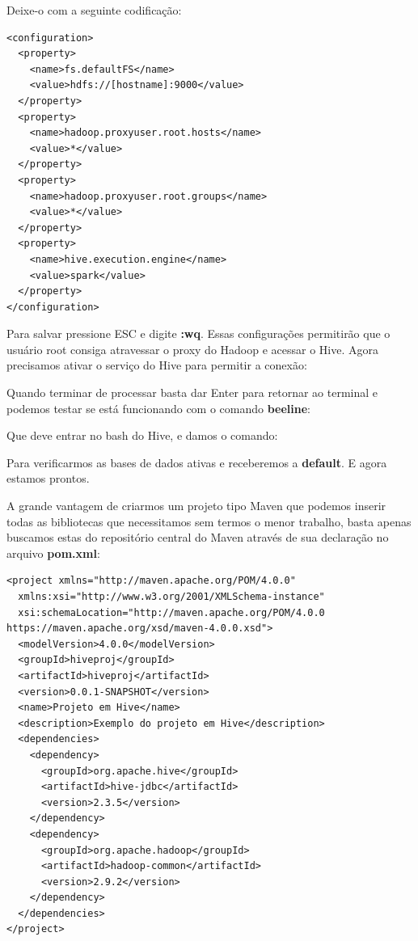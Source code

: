 \documentclass[a4paper,11pt]{article}
\begin{document}
Deixe-o com a seguinte codificação:
\begin{lstlisting}[]
<configuration>
  <property>
    <name>fs.defaultFS</name>
    <value>hdfs://[hostname]:9000</value>
  </property>
  <property>
    <name>hadoop.proxyuser.root.hosts</name>
    <value>*</value>
  </property>
  <property>
    <name>hadoop.proxyuser.root.groups</name>
    <value>*</value>
  </property>
  <property>
    <name>hive.execution.engine</name>
    <value>spark</value>
  </property>  
</configuration>
\end{lstlisting}

Para salvar pressione ESC e digite \textbf{:wq}. Essas configurações permitirão que o usuário root consiga atravessar o proxy do Hadoop e acessar o Hive. Agora precisamos ativar o serviço do Hive para permitir a conexão: \\

Quando terminar de processar basta dar Enter para retornar ao terminal e podemos testar se está funcionando com o comando \textbf{beeline}: \\

Que deve entrar no bash do Hive, e damos o comando: 

Para verificarmos as bases de dados ativas e receberemos a \textbf{default}. E agora estamos prontos.

A grande vantagem de criarmos um projeto tipo Maven que podemos inserir todas as bibliotecas que necessitamos sem termos o menor trabalho, basta apenas buscamos estas do repositório central do Maven através de sua declaração no arquivo \textbf{pom.xml}:
\begin{lstlisting}[]
<project xmlns="http://maven.apache.org/POM/4.0.0"
  xmlns:xsi="http://www.w3.org/2001/XMLSchema-instance"
  xsi:schemaLocation="http://maven.apache.org/POM/4.0.0 https://maven.apache.org/xsd/maven-4.0.0.xsd">
  <modelVersion>4.0.0</modelVersion>
  <groupId>hiveproj</groupId>
  <artifactId>hiveproj</artifactId>
  <version>0.0.1-SNAPSHOT</version>
  <name>Projeto em Hive</name>
  <description>Exemplo do projeto em Hive</description>
  <dependencies>
    <dependency>
      <groupId>org.apache.hive</groupId>
      <artifactId>hive-jdbc</artifactId>
      <version>2.3.5</version>
    </dependency>
    <dependency>
      <groupId>org.apache.hadoop</groupId>
      <artifactId>hadoop-common</artifactId>
      <version>2.9.2</version>
    </dependency>
  </dependencies>
</project>
\end{lstlisting}
\end{document}

